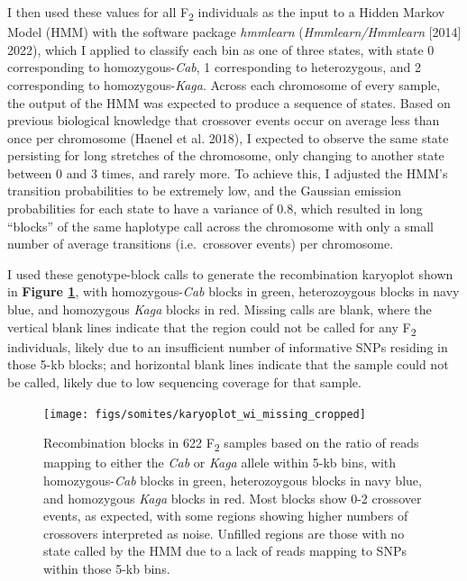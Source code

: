 \documentclass[
]{book}
\begin{document}
I then used these values for all F\textsubscript{2} individuals as the input to a Hidden Markov Model (HMM) with the software package \emph{hmmlearn} (\emph{Hmmlearn/Hmmlearn} {[}2014{]} 2022), which I applied to classify each bin as one of three states, with state 0 corresponding to homozygous-\emph{Cab}, 1 corresponding to heterozygous, and 2 corresponding to homozygous-\emph{Kaga}. Across each chromosome of every sample, the output of the HMM was expected to produce a sequence of states. Based on previous biological knowledge that crossover events occur on average less than once per chromosome (Haenel et al. 2018), I expected to observe the same state persisting for long stretches of the chromosome, only changing to another state between 0 and 3 times, and rarely more. To achieve this, I adjusted the HMM's transition probabilities to be extremely low, and the Gaussian emission probabilities for each state to have a variance of 0.8, which resulted in long ``blocks'' of the same haplotype call across the chromosome with only a small number of average transitions (i.e.~crossover events) per chromosome.

\clearpage

I used these genotype-block calls to generate the recombination karyoplot shown in \textbf{Figure \ref{fig:karyo-wi-missing}}, with homozygous-\emph{Cab} blocks in green, heterozoygous blocks in navy blue, and homozygous \emph{Kaga} blocks in red. Missing calls are blank, where the vertical blank lines indicate that the region could not be called for any F\textsubscript{2} individuals, likely due to an insufficient number of informative SNPs residing in those 5-kb blocks; and horizontal blank lines indicate that the sample could not be called, likely due to low sequencing coverage for that sample.



\begin{figure}

{\centering \texttt{[image: figs/somites/karyoplot\_wi\_missing\_cropped]} 

}

\caption{Recombination blocks in 622 F\textsubscript{2} samples based on the ratio of reads mapping to either the \emph{Cab} or \emph{Kaga} allele within 5-kb bins, with homozygous-\emph{Cab} blocks in green, heterozoygous blocks in navy blue, and homozygous \emph{Kaga} blocks in red. Most blocks show 0-2 crossover events, as expected, with some regions showing higher numbers of crossovers interpreted as noise. Unfilled regions are those with no state called by the HMM due to a lack of reads mapping to SNPs within those 5-kb bins.}\label{fig:karyo-wi-missing}
\end{figure}
\end{document}
